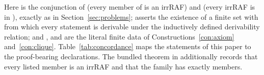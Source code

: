 \documentclass[11pt,a4paper]{article}
\theoremstyle{plain}
\theoremstyle{definition}
\theoremstyle{remark}
\begin{document}
\noindent Here  is the conjunction of  (every member of  is an irrRAF) and  (every irrRAF is in ), exactly as in Section~\ref{sec:problems};  asserts the existence of a finite set  with  from which every statement is derivable under the inductively defined derivability relation; and ,  and  are the literal finite data of Constructions~\ref{con:axiom} and~\ref{con:clique}. Table~\ref{tab:concordance} maps the statements of this paper to the proof-bearing declarations. The bundled theorem  in  additionally records that every listed member is an irrRAF and that the family has exactly  members.
\end{document}
